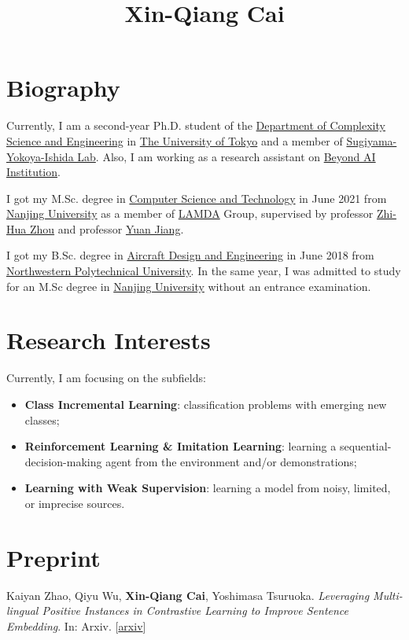 \documentclass[UTF8]{ctexart}
\title{Xin-Qiang Cai}
\author{}
\date{}
\begin{document}
\maketitle

\section*{Biography}
Currently, I am a second-year Ph.D. student of the \href{https://www.k.u-tokyo.ac.jp/complex/index_e.html}{Department of Complexity Science and Engineering} in \href{https://www.u-tokyo.ac.jp/en/}{The University of Tokyo} and a member of \href{http://www.ms.k.u-tokyo.ac.jp/}{Sugiyama-Yokoya-Ishida Lab}. Also, I am working as a research assistant on \href{https://beyondai.jp/}{Beyond AI Institution}.

I got my M.Sc. degree in \href{https://www.nju.edu.cn/en/7f/6b/c7136a163691/page.psp}{Computer Science and Technology} in June 2021 from \href{http://www.nju.edu.cn/}{Nanjing University} as a member of \href{http://www.lamda.nju.edu.cn/}{LAMDA} Group, supervised by professor \href{https://cs.nju.edu.cn/zhouzh/}{Zhi-Hua Zhou} and professor \href{http://www.lamda.nju.edu.cn/jiangy/}{Yuan Jiang}.

I got my B.Sc. degree in \href{http://hangkong.nwpu.edu.cn//}{Aircraft Design and Engineering} in June 2018 from \href{https://www.nwpu.edu.cn/}{Northwestern Polytechnical University}. In the same year, I was admitted to study for an M.Sc degree in \href{http://www.nju.edu.cn/}{Nanjing University} without an entrance examination.

\section*{Research Interests}
Currently, I am focusing on the subfields:
\begin{itemize}
    \item \textbf{Class Incremental Learning}: classification problems with emerging new classes;
    \item \textbf{Reinforcement Learning \& Imitation Learning}: learning a sequential-decision-making agent from the environment and/or demonstrations;
    \item \textbf{Learning with Weak Supervision}: learning a model from noisy, limited, or imprecise sources.
\end{itemize}

\section*{Preprint}
Kaiyan Zhao, Qiyu Wu, \textbf{Xin-Qiang Cai}, Yoshimasa Tsuruoka. \textit{Leveraging Multi-lingual Positive Instances in Contrastive Learning to Improve Sentence Embedding}. In: Arxiv. [\href{https://arxiv.org/abs/2309.08929}{arxiv}]
\end{document}
